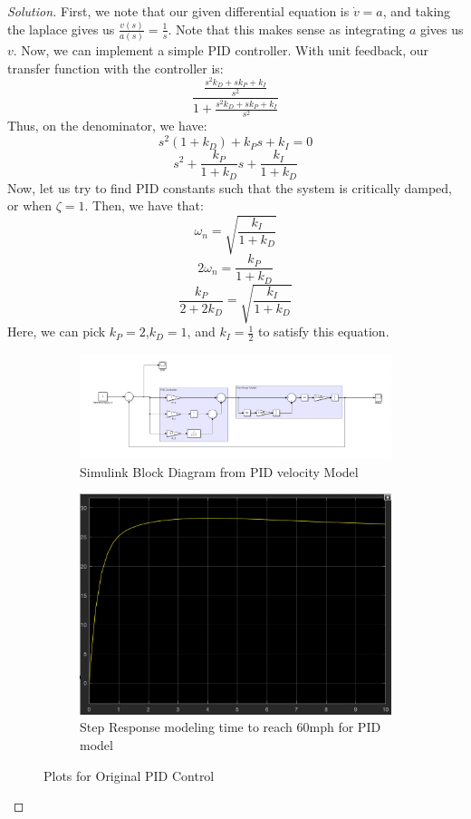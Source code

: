 \documentclass{article}
\begin{document}
\begin{proof}[Solution]
First, we note that our given differential equation is $\dot{v}=a$, and taking the laplace gives us $\frac{v(s)}{a(s)}=\frac{1}{s}$.
Note that this makes sense as integrating $a$ gives us $v$. \newline
Now, we can implement a simple PID controller. With unit feedback, our transfer function with the controller is:
\[\dfrac{\frac{s^2k_{D}+sk_{P}+k_{I}}{s^2}}{1+\frac{s^2k_{D}+sk_{P}+k_{I}}{s^2}}
\]
Thus, on the denominator, we have: 
\[s^2(1+k_{D})+k_{P}s+k_{I}=0
\]
\[s^2+\frac{k_{P}}{1+k_{D}}s+\frac{k_{I}}{1+k_{D}}
\]
Now, let us try to find PID constants such that the system is critically damped, or when $\zeta=1$.
Then, we have that:
\[\omega_{n} = \sqrt{\frac{k_{I}}{1+k_{D}}}\]
\[2\omega_{n}=\frac{k_{P}}{1+k_{D}}\]
\[\frac{k_{P}}{2+2k_{D}} =  \sqrt{\frac{k_{I}}{1+k_{D}}}\]
Here, we can pick $k_P=2$,$k_D=1$, and $k_I=\frac{1}{2}$ to satisfy this equation. 

\begin{figure}[h!]
    \centering
    \begin{subfigure}{0.4\linewidth}
      \includegraphics[width=\linewidth]{Q3Model.png}
      \caption{Simulink Block Diagram from PID velocity Model}
    \end{subfigure}
    \begin{subfigure}{0.4\linewidth}
      \includegraphics[width=\linewidth]{img12.png}
      \caption{Step Response modeling time to reach 60mph for PID model}
    \end{subfigure}
    \caption{Plots for Original PID Control}
  \end{figure}


\end{proof}
\end{document}
